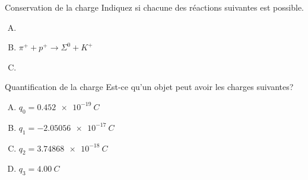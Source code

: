 \documentclass{beamer}
\begin{document}
\begin{frame}{Conservation de la charge}
  Indiquez si chacune des réactions suivantes est possible.

  \begin{enumerate}[A.]
    \item {} 
    \item $\pi^+ + p^+ \longrightarrow \Sigma^0 + K^+$ 
    \item {} 
  \end{enumerate}
\end{frame}


\begin{frame}{Quantification de la charge}
  Est-ce qu'un objet peut avoir les charges suivantes?
  \begin{enumerate}[A.]
    \item $q_0 = \SI{0.452e-19}{C}$  
    \item $q_1 = \SI{-2.05056e-17}{C}$ 
    \item $q_2 = \SI{3.74868e-18}{C}$ 
    \item $q_3 = \SI{4.00}{C}$ 
  \end{enumerate}
\end{frame}
\end{document}
